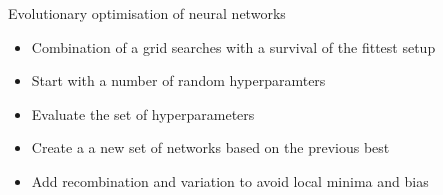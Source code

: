 \begin{frame}{Evolutionary optimisation of neural networks}
    \begin{itemize}
        \item Combination of a grid searches with a survival of the fittest setup
        \vspace{0.2cm}
        \item Start with a number of random hyperparamters
        \vspace{0.2cm}
        \item Evaluate the set of hyperparameters
        \vspace{0.2cm}
        \item Create a a new set of networks based on the previous best
        \vspace{0.2cm}
        \item Add recombination and variation to avoid local minima and bias
    \end{itemize}
\end{frame}




